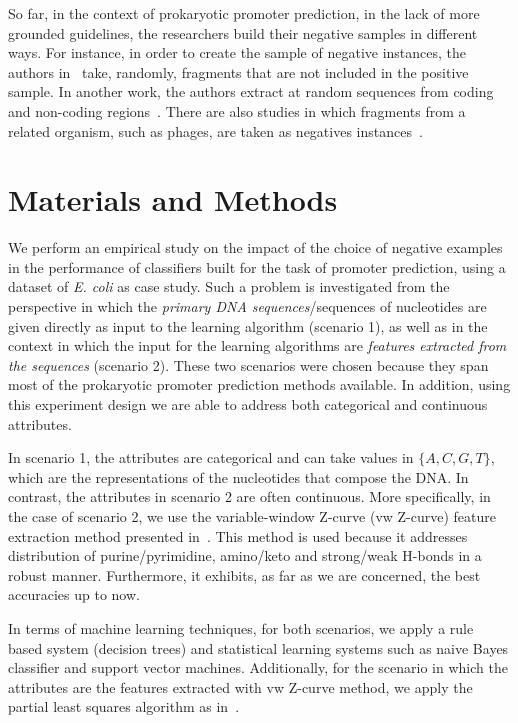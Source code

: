 \documentclass[conference,letterpaper]{IEEEtran}
\begin{document}
So far, in the context of prokaryotic promoter prediction, in the lack of more grounded guidelines, the researchers build their negative samples in different ways. For instance, in order to create the sample of negative instances, the authors in~\cite{bland2010} take, randomly, fragments that are not included in the positive sample. In another work, the authors extract at random sequences from coding and non-coding regions~\cite{hutchinson1996,gordon2003}. There are also studies in which fragments from a related organism, such as phages, are taken as negatives instances~\cite{towell1993,monteiro2005}.

\section{Materials and Methods}
\label{sec:methods}

We perform an empirical study on the impact of the choice of negative examples in the performance of classifiers built for the task of promoter prediction, using a dataset of {\it E. coli} as case study. Such a problem is investigated from the perspective in which the {\it primary DNA sequences}/sequences of nucleotides are given directly as input to the learning algorithm (scenario 1), as well as in the context in which the input for the learning algorithms are {\it features extracted from the sequences} (scenario 2). These two scenarios were chosen because they span most of the prokaryotic promoter prediction methods available. In addition, using this experiment design we are able to address both categorical and continuous attributes.

In scenario 1, the attributes are categorical and can take values in $\{A,C,G,T\}$, which are the representations of the nucleotides that compose the DNA. In contrast, the attributes in scenario 2 are often continuous. More specifically, in the case of scenario 2, we use the variable-window Z-curve (vw Z-curve) feature extraction method presented in~\cite{song2011a}.  This method is used because it addresses distribution of purine/pyrimidine, amino/keto and strong/weak H-bonds in a robust manner. Furthermore, it exhibits, as far as we are concerned, the best accuracies up to now.

In terms of machine learning techniques, for both scenarios, we apply a rule based system (decision trees) and statistical learning systems such as naive Bayes classifier and support vector machines. Additionally, for the scenario in which the attributes are the features extracted with vw Z-curve method, we apply the partial least squares algorithm as in~\cite{song2011a}. 
\end{document}
